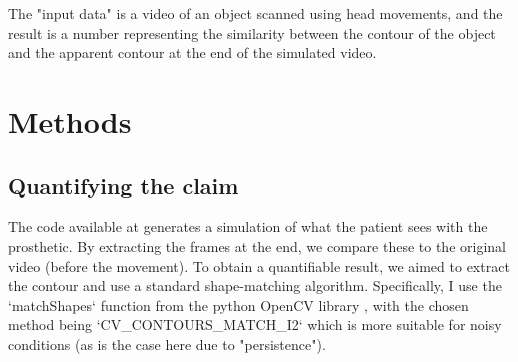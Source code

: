 \documentclass[]{article}
\begin{document}
The "input data" is a video of an object scanned using head movements, and the result is a number representing the similarity between the contour of the object and the apparent contour at the end of the simulated video.
\section{Methods}
\subsection{Quantifying the claim}
The code available at \cite{paper_code} generates a simulation of what the patient sees with the prosthetic. By extracting the frames at the end, we compare these to the original video (before the movement).
To obtain a quantifiable result, we aimed to extract the contour and use a standard shape-matching algorithm. Specifically, I use the `matchShapes` function from the python OpenCV library \cite{opencv_library} , with the chosen method being `CV\_CONTOURS\_MATCH\_I2` which is more suitable for noisy conditions (as is the case here due to "persistence").
\end{document}
